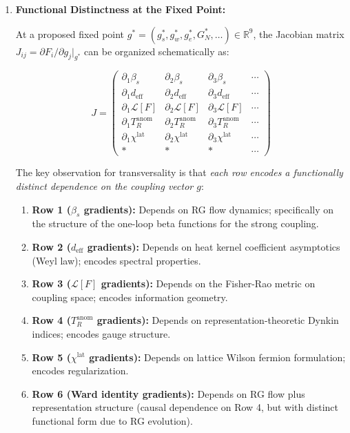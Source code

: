{\begin{remark}
\begin{enumerate}
Each gradient encodes information from a distinct source: RG flow structure, spectral theory, information geometry, gauge theory, regularization, and Ward preservation.

\item \textbf{Functional Distinctness at the Fixed Point:}

At a proposed fixed point $g^* = (g_s^*, g_w^*, g_e^*, G_N^*, \ldots) \in \mathbb{R}^9$, the Jacobian matrix $J_{ij} = \partial F_i / \partial g_j |_{g^*}$ can be organized schematically as:

\begin{equation}
J = \begin{pmatrix}
\partial_1 \beta_s & \partial_2 \beta_s & \partial_3 \beta_s & \cdots \\
\partial_1 d_{\mathrm{eff}} & \partial_2 d_{\mathrm{eff}} & \partial_3 d_{\mathrm{eff}} & \cdots \\
\partial_1 \mathcal{L}[F] & \partial_2 \mathcal{L}[F] & \partial_3 \mathcal{L}[F] & \cdots \\
\partial_1 T_R^{\mathrm{anom}} & \partial_2 T_R^{\mathrm{anom}} & \partial_3 T_R^{\mathrm{anom}} & \cdots \\
\partial_1 \chi^{\mathrm{lat}} & \partial_2 \chi^{\mathrm{lat}} & \partial_3 \chi^{\mathrm{lat}} & \cdots \\
* & * & * & \cdots
\end{pmatrix}
\end{equation}

The key observation for transversality is that \emph{each row encodes a functionally distinct dependence on the coupling vector $g$}:

\begin{enumerate}
\item \textbf{Row 1 ($\beta_s$ gradients):} Depends on RG flow dynamics; specifically on the structure of the one-loop beta functions for the strong coupling.
\item \textbf{Row 2 ($d_{\mathrm{eff}}$ gradients):} Depends on heat kernel coefficient asymptotics (Weyl law); encodes spectral properties.
\item \textbf{Row 3 ($\mathcal{L}[F]$ gradients):} Depends on the Fisher-Rao metric on coupling space; encodes information geometry.
\item \textbf{Row 4 ($T_R^{\mathrm{anom}}$ gradients):} Depends on representation-theoretic Dynkin indices; encodes gauge structure.
\item \textbf{Row 5 ($\chi^{\mathrm{lat}}$ gradients):} Depends on lattice Wilson fermion formulation; encodes regularization.
\item \textbf{Row 6 (Ward identity gradients):} Depends on RG flow plus representation structure (causal dependence on Row 4, but with distinct functional form due to RG evolution).
\end{enumerate}


\end{enumerate}
\end{remark}}
